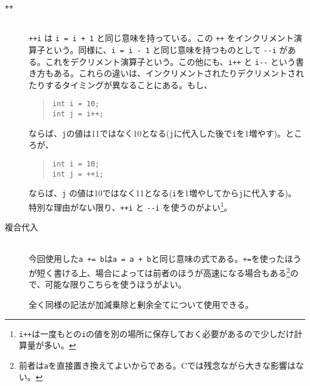 \begin{description}
    \item[\texttt{++}]\mbox{}\\
          \texttt{++i} は \texttt{i = i + 1} と同じ意味を持っている。この \texttt{++} をインクリメント演算子という。同様に、\texttt{i = i - 1} と同じ意味を持つものとして \texttt{{-}{-}i} がある。これをデクリメント演算子という。この他にも、\texttt{i++} と \texttt{i{-}{-}} という書き方もある。これらの違いは、インクリメントされたりデクリメントされたりするタイミングが異なることにある。もし、
          \begin{quote}
              \begin{verbatim}
int i = 10;
int j = i++;
\end{verbatim}
          \end{quote}
          ならば、\texttt{j}の値は11ではなく10となる(\texttt{j}に代入した後で\texttt{i}を1増やす)。ところが、
          \begin{quote}
              \begin{verbatim}
int i = 10;
int j = ++i;
\end{verbatim}
          \end{quote}
          ならば、\texttt{j} の値は10ではなく11となる(\texttt{i}を1増やしてから\texttt{j}に代入する)。
          特別な理由がない限り、\texttt{++i} と \texttt{{-}{-}i} を使うのがよい\footnote{\texttt{i++}は一度もとの\texttt{i}の値を別の場所に保存しておく必要があるので少しだけ計算量が多い。}。
    \item[複合代入]\mbox{}\\
          今回使用した\texttt{a += b}は\texttt{a = a + b}と同じ意味の式である。\texttt{+=}を使ったほうが短く書ける上、場合によっては前者のほうが高速になる場合もある\footnote{前者は\texttt{a}を直接置き換えてよいからである。Cでは残念ながら大きな影響はない。}ので、可能な限りこちらを使うほうがよい。

          全く同様の記法が加減乗除と剰余全てについて使用できる。
\end{description}


